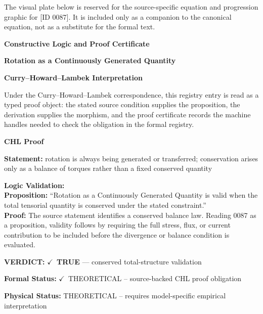 \begingroup\footnotesize\sloppy
The visual plate below is reserved for the source-specific equation and progression graphic for [ID 0087]. It is included only as a companion to the canonical equation, not as a substitute for the formal text.
\par\endgroup
\ifTZPDarkEdition
{}
\fi

\clearpage
\begingroup\tzpsupportsetup
\noindent\textbf{\fontsize{10.8pt}{12.8pt}\selectfont [ID 0087] Constructive Logic and Proof Certificate}\par
\noindent\textbf{\fontsize{10pt}{12pt}\selectfont Rotation as a Continuously Generated Quantity}\par
\vspace{0.45em}
\begingroup
\footnotesize
\setlength{\parskip}{0.22em}
\setlength{\parindent}{0pt}
\noindent\textbf{Curry--Howard--Lambek Interpretation}\par
Under the Curry--Howard--Lambek correspondence, this registry entry is read as a typed proof
object: the stated source condition supplies the proposition, the derivation supplies the
morphism, and the proof certificate records the machine handles needed to check the obligation
in the formal registry.

\vspace{0.45em}
\noindent\textbf{CHL Proof}\par
\textbf{Statement:} rotation is always being generated or transferred; conservation arises only as a balance
of torques rather than a fixed conserved quantity

\textbf{Logic Validation:}\\
\textbf{Proposition:} ``Rotation as a Continuously Generated Quantity is valid when the total tensorial quantity
is conserved under the stated constraint.''\\
\textbf{Proof:} The source statement identifies a conserved balance law. Reading 0087 as a proposition,
validity follows by requiring the full stress, flux, or current contribution to be
included before the divergence or balance condition is evaluated.

\textbf{VERDICT:} \ensuremath{\checkmark}\ \textbf{TRUE} --- conserved total-structure validation

\textbf{Formal Status:} \ensuremath{\checkmark}\ THEORETICAL -- source-backed CHL proof obligation

\textbf{Physical Status:} THEORETICAL -- requires model-specific empirical interpretation
\par\vspace{0.45em}
\par
\ifTZPDarkEdition
{}
\fi
\endgroup
\endgroup
